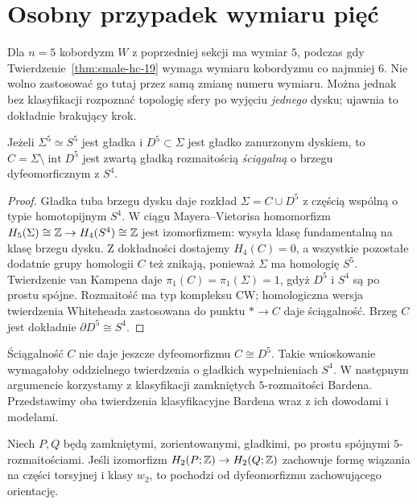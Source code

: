 \section{Osobny przypadek wymiaru pięć}
\label{sec:poincare-five}

Dla $n=5$ kobordyzm $W$ z poprzedniej
sekcji ma wymiar $5$, podczas gdy
Twierdzenie~\ref{thm:smale-hc-19}
wymaga wymiaru kobordyzmu co najmniej $6$.
Nie wolno zastosować go tutaj przez
samą zmianę numeru wymiaru.
Można jednak bez klasyfikacji rozpoznać
topologię sfery po wyjęciu \emph{jednego}
dysku; ujawnia to dokładnie brakujący krok.

\begin{lemat}
\label{lem:punctured-five-24}
Jeżeli $\Sigma^5\simeq S^5$ jest gładka
i $D^5\subset\Sigma$ jest gładko zanurzonym
dyskiem, to
$C=\Sigma\setminus\operatorname{int}D^5$
jest zwartą gładką rozmaitością
\emph{ściągalną} o brzegu dyfeomorficznym
z $S^4$.
\end{lemat}
\begin{proof}
Gładka tuba brzegu dysku daje rozkład
$\Sigma=C\cup D^5$ z częścią wspólną
o typie homotopijnym $S^4$.
W ciągu Mayera--Vietorisa homomorfizm
$H_5(\Sigma)\cong\mathbb{Z}\to H_4(S^4)\cong\mathbb{Z}$
jest izomorfizmem: wysyła klasę
fundamentalną na klasę brzegu dysku.
Z dokładności dostajemy $H_4(C)=0$,
a wszystkie pozostałe dodatnie grupy
homologii $C$ też znikają, ponieważ
$\Sigma$ ma homologię $S^5$.
Twierdzenie van Kampena daje
$\pi_1(C)=\pi_1(\Sigma)=1$,
gdyż $D^5$ i $S^4$ są po prostu spójne.
Rozmaitość ma typ kompleksu CW;
homologiczna wersja twierdzenia
Whiteheada zastosowana do
punktu $*\to C$ daje ściągalność.
Brzeg $C$ jest dokładnie
$\partial D^5\cong S^4$.
\end{proof}

Ściągalność $C$ nie daje jeszcze
dyfeomorfizmu $C\cong D^5$.
Takie wnioskowanie wymagałoby
oddzielnego twierdzenia o gładkich
wypełnieniach $S^4$. W następnym
argumencie korzystamy z klasyfikacji
zamkniętych $5$-rozmaitości Bardena.
Przedstawimy oba twierdzenia klasyfikacyjne
Bardena wraz z ich dowodami i modelami.

\begin{twierdzenie}
\label{thm:Barden-5-24}
Niech $P,Q$ będą zamkniętymi, zorientowanymi,
gładkimi, po prostu spójnymi
$5$-rozmaitościami. Jeśli izomorfizm
$H_2(P;\mathbb{Z})\to H_2(Q;\mathbb{Z})$ zachowuje
formę wiązania na części torsyjnej
i klasy $w_2$, to pochodzi od
dyfeomorfizmu zachowującego orientację.
\end{twierdzenie}

